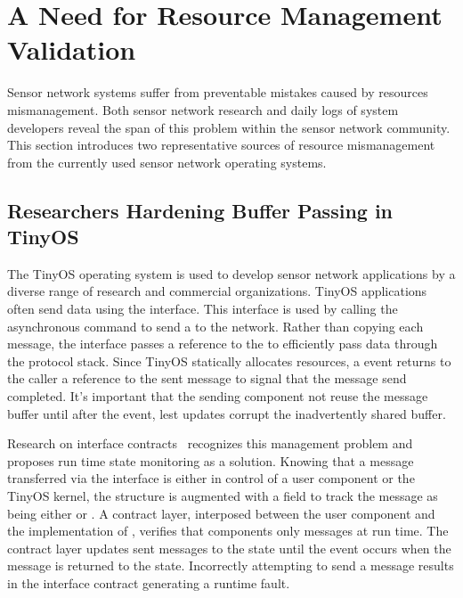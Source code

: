 \section{A Need for Resource Management Validation}
\label{sec:mot}

Sensor network systems suffer from preventable mistakes caused by resources
mismanagement.
%
Both sensor network research and daily logs of system developers reveal the
span of this problem within the sensor network community.
%
This section introduces two representative sources of resource mismanagement
from the currently used sensor network operating systems.



\subsection{Researchers Hardening Buffer Passing in TinyOS}
\label{ssec:tinyos}


The TinyOS operating system is used to develop sensor network applications by
a diverse range of research and commercial organizations.
%
TinyOS applications often send data using the  interface.
%
This interface is used by calling the asynchronous  command to
send a  to the network.
%
Rather than copying each message, the  interface passes a
reference to the  to efficiently pass data through the protocol
stack.
%
Since TinyOS statically allocates resources, a  event returns to
the caller a reference to the sent message to signal that the message send
completed.
%
It's important that the sending component not reuse the message buffer until
after the  event, lest updates corrupt the inadvertently shared
buffer.



Research on interface contracts~\cite{archer07interface} recognizes this
management problem and proposes run time state monitoring as a solution.
%
Knowing that a message transferred via the  interface is
either in control of a user component or the TinyOS kernel, the
 structure is augmented with a  field to
track the message as being either  or .
%
A contract layer, interposed between the user component and the
implementation of , verifies that components only 
 messages at run time.
%
The contract layer updates sent messages to the  state until
the  event occurs when the message is returned to the
 state.
%
Incorrectly attempting to send a  message results in the
interface contract generating a runtime fault.



